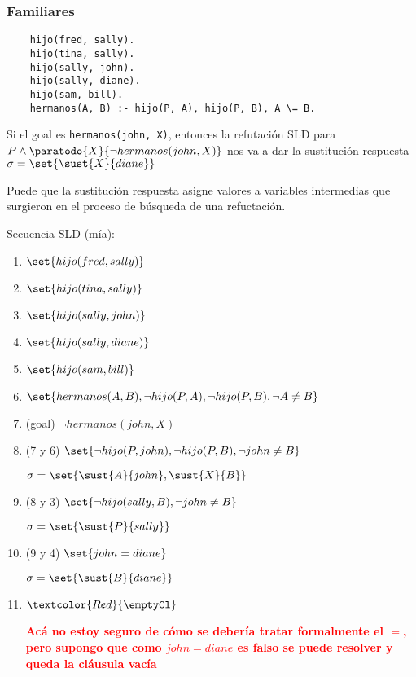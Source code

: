 \documentclass{report}
\theoremstyle{definition} %
\newcommand{\todo}[1]{{\textcolor{red}{\textbf{#1}}}}
\newcommand{\changed}[1]{\textcolor{Red}{#1}}
\begin{document}
\subsubsection{Familiares}

\begin{verbatim}
    hijo(fred, sally).
    hijo(tina, sally).
    hijo(sally, john).
    hijo(sally, diane).
    hijo(sam, bill).
    hermanos(A, B) :- hijo(P, A), hijo(P, B), A \= B.
\end{verbatim}

Si el goal es \texttt{hermanos(john, X)}, entonces la refutación SLD para $P
\wedge \paratodo{X}{\neg hermanos(john, X)}$ nos va a dar la sustitución respuesta
$\sigma = \set{\sust{X}{diane}}$

Puede que la sustitución respuesta asigne valores a variables intermedias que
surgieron en el proceso de búsqueda de una refuctación.

Secuencia SLD (mía):

\begin{enumerate}
    \item $\set{hijo(fred, sally)}$
    \item $\set{hijo(tina, sally)}$
    \item $\set{hijo(sally, john)}$
    \item $\set{hijo(sally, diane)}$
    \item $\set{hijo(sam, bill)}$
    \item $\set{hermanos(A, B),\neg hijo(P, A),\neg hijo(P, B),\neg A \neq B}$
    \item (goal) $\neg hermanos(john, X)$
    \item (7 y 6)
    $\set{\neg hijo(P, john),\neg hijo(P, B),\neg john \neq B}$
    
    $\sigma = \set{\sust{A}{john}, \sust{X}{B}}$
    \item (8 y 3)
    $\set{\neg hijo(sally, B), \neg john \neq B}$
    
    $\sigma = \set{\sust{P}{sally}}$
    \item (9 y 4)
    $\set{john = diane}$
    
    $\sigma = \set{\sust{B}{diane}}$
    \item $\changed{\emptyCl}$
    
    \todo{Acá no estoy seguro de cómo se debería tratar formalmente el $=$, pero
    supongo que como $john = diane$ es falso se puede resolver y queda la
    cláusula vacía}
\end{enumerate}
\end{document}

